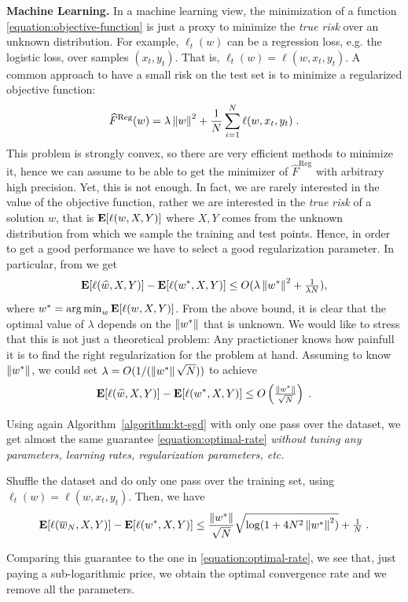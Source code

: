 \textbf{Machine Learning.} In a machine learning view, the minimization of a
function \eqref{equation:objective-function} is just a proxy to minimize the
\emph{true risk} over an unknown distribution. For example, $\ell_t(w)$ can be
a regression loss, e.g. the logistic loss, over samples $(x_t, y_t)$. That is,
$\ell_t(w)=\ell(w,x_t,y_t)$. A common approach to have a small
risk on the test set is to minimize a regularized objective function:
%
\begin{equation}
\label{eq:reg_logloss}
\widehat{F}^{\text{Reg}}(w) = \lambda \left\|{w}\right\|^2 + \frac{1}{N} \sum_{i=1}^N \ell(w,x_t,y_t) \; .
\end{equation}
%
This problem is strongly convex, so there are very efficient methods to
minimize it, hence we can assume to be able to get the minimizer of
$\widehat{F}^{\text{Reg}}$ with arbitrary high precision. Yet, this is not
enough. In fact, we are rarely interested in the value of the objective
function, rather we are interested in the \emph{true risk} of a solution $w$,
that is $\operatorname*{\mathbf{E}}[\ell(w,X,Y)]$ where $X,Y$ comes from the unknown distribution
from which we sample the training and test points.  Hence, in order to get a
good performance we have to select a good regularization parameter. In
particular, from \cite{Sridharan-Shalev-Shwartz-Srebro-2009} we get
\[
\operatorname*{\mathbf{E}}[\ell(\widehat{w},X,Y)] - \operatorname*{\mathbf{E}}[\ell(w^*,X,Y)] \le O(\lambda \left\|{w^*}\right\|^2 + \tfrac{1}{\lambda N}),
\]
where $w^*=\operatorname*{arg\,min}_w \operatorname*{\mathbf{E}}[\ell(w,X,Y)]$.  From the above bound, it is clear
that the optimal value of $\lambda$ depends on the $\left\|{w^*}\right\|$ that is
unknown. We would like to stress that this is not just a theoretical problem:
Any practictioner knows how painfull it is to find the right regularization for
the problem at hand.  Assuming to know $\left\|{w^*}\right\|$, we could set $\lambda =
O(1/(\left\|{w^*}\right\| \sqrt{N}))$ to achieve
%
\begin{equation}
\label{equation:optimal-rate}
\operatorname*{\mathbf{E}}[\ell(\widehat{w},X,Y)] - \operatorname*{\mathbf{E}}[\ell(w^*,X,Y)] \le O\left(\tfrac{\left\|{w^*}\right\|}{\sqrt{N}}\right) \; .
\end{equation}

Using again Algorithm~\ref{algorithm:kt-sgd} with only one pass over the
dataset, we get almost the same guarantee \eqref{equation:optimal-rate}
\emph{without tuning any parameters, learning rates, regularization parameters,
etc.}
%
\begin{theorem}
Shuffle the dataset and do only one pass over the training set, using
$\ell_t(w)=\ell(w,x_t,y_t)$.  Then, we have
$$
\operatorname*{\mathbf{E}}[\ell(\overline{w}_N,X,Y)] - \operatorname*{\mathbf{E}}[\ell(w^*,X,Y)] \le \frac{\left\|{w^*}\right\|}{\sqrt{N}} \sqrt{\log(1+4 N^2 \left\|{w^*}\right\|^2)} + \tfrac{1}{N} \; .
$$
\end{theorem}
%
Comparing this guarantee to the one in \eqref{equation:optimal-rate}, we see
that, just paying a sub-logarithmic price, we obtain the optimal convergence
rate and we remove all the parameters.


